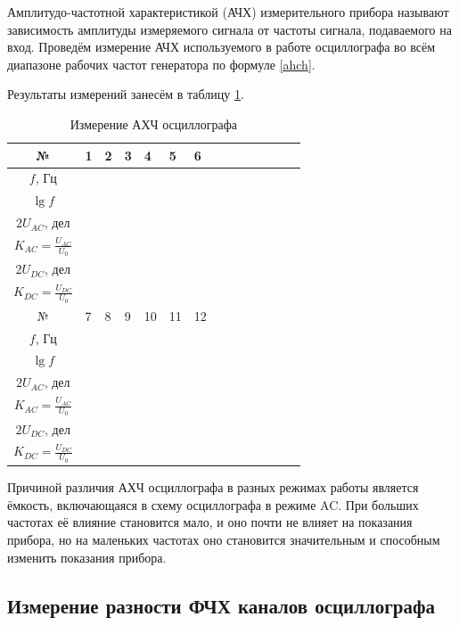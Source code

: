 \documentclass[a4paper,12pt]{article} %
\begin{document}
	Амплитудо-частотной характеристикой (АЧХ) измерительного прибора называют зависимость амплитуды измеряемого
	сигнала от частоты сигнала, подаваемого на вход. Проведём измерение АЧХ используемого в работе осциллографа во всём диапазоне
	рабочих частот генератора по формуле \eqref{ahch}.
	
	Результаты измерений занесём в таблицу \ref{tab:ahch}.
	
	\begin{table}[H]
		\centering
		\begin{tabular}{|c|p{1.2cm}|p{1.2cm}|p{1.2cm}|p{1.2cm}|p{1.2cm}|p{1.2cm}| c|c|c|c|c|c|c|} 
			\hline
			№ &  1  & 2  &  3  &  4  & 5 & 6 \\ \hline
			$ f $, Гц &   &  &  &  & &  \\ \hline
			$ \lg f $ &  &  &  &  & &  \\ \hline
			$ 2U_{AC} $, дел & &  &  &  & &  \\ \hline
			$ K_{AC} = \frac{U_{AC}}{U_0} $& &  &  &  & &  \\ \hline
			$ 2U_{DC} $, дел & &  &  &  & &  \\ \hline
			$ K_{DC} = \frac{U_{DC}}{U_0} $ & &  &  &  & &  \\ \hline \hline
			№ & 7 & 8 & 9 & 10 & 11 & 12 \\ \hline
			$ f $, Гц & &  &  &  & &  \\ \hline
			$ \lg f $ & &  &  &  & &  \\ \hline
			$ 2U_{AC} $, дел & &  &  &  & &  \\ \hline
			$ K_{AC} = \frac{U_{AC}}{U_0} $ & &  &  &  & &  \\ \hline
			$ 2U_{DC} $, дел & &  &  &  & &  \\ \hline
			$ K_{DC} = \frac{U_{DC}}{U_0} $ & &  &  &  & &  \\ \hline
		\end{tabular}
		\caption{Измерение АХЧ осциллографа}
		\label{tab:ahch}
	\end{table}
	
	Причиной различия АХЧ осциллографа в разных режимах работы является ёмкость, включающаяся в схему осциллографа в режиме AC. При больших частотах её влияние становится мало, и оно почти не влияет на показания прибора, но на маленьких частотах оно становится значительным и способным изменить показания прибора.
	
	\subsection{Измерение разности ФЧХ каналов осциллографа}
	
\end{document}

